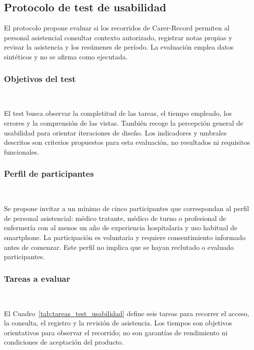 \subsection{Protocolo de test de usabilidad}

El protocolo propone evaluar si los recorridos de Carer-Record permiten al personal asistencial consultar contexto autorizado, registrar notas propias y revisar la asistencia y los resúmenes de período. La evaluación emplea datos sintéticos y no se afirma como ejecutada.

\subsubsection*{Objetivos del test} ~

El test busca observar la completitud de las tareas, el tiempo empleado, los errores y la comprensión de las vistas. También recoge la percepción general de usabilidad para orientar iteraciones de diseño. Los indicadores y umbrales descritos son criterios propuestos para esta evaluación, no resultados ni requisitos funcionales.

\subsubsection*{Perfil de participantes} ~

Se propone invitar a un mínimo de cinco participantes que correspondan al perfil de personal asistencial: médico tratante, médico de turno o profesional de enfermería con al menos un año de experiencia hospitalaria y uso habitual de smartphone. La participación es voluntaria y requiere consentimiento informado antes de comenzar. Este perfil no implica que se hayan reclutado o evaluado participantes.

\subsubsection*{Tareas a evaluar} ~

El Cuadro~\ref{tab:tareas_test_usabilidad} define seis tareas para recorrer el acceso, la consulta, el registro y la revisión de asistencia. Los tiempos son objetivos orientativos para observar el recorrido; no son garantías de rendimiento ni condiciones de aceptación del producto.

